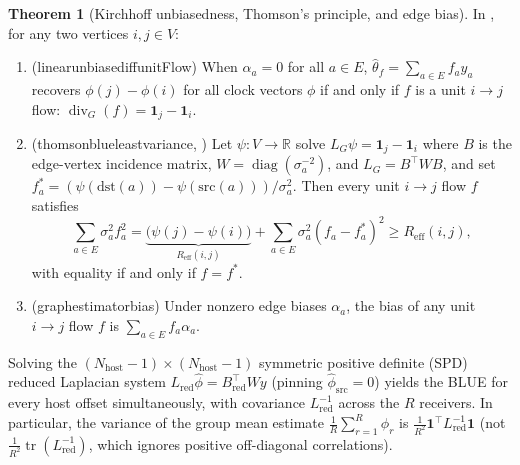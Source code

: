 \documentclass[11pt,a4paper]{article}
\DeclareRobustCommand{\lean}[1]{{\ttfamily\def\_{\textunderscore\allowbreak}#1}}
\newcommand{\R}{\mathbb{R}}
\theoremstyle{definition}
\newtheorem{theorem}[definition]{Theorem}
\begin{document}
\begin{theorem}[Kirchhoff unbiasedness, Thomson's principle, and edge bias]
\label{thm:thomson}
In , for any two vertices $i, j \in V$:
\begin{enumerate}
\item (\lean{linear\_unbiased\_iff\_unitFlow}) When $\alpha_a = 0$ for all
  $a \in E$, $\hat\theta_f = \sum_{a \in E} f_a y_a$ recovers
  $\phi(j) - \phi(i)$ for all clock vectors $\phi$ if and only if $f$ is a unit
  $i \to j$ flow: $\operatorname{div}_G(f) = \mathbf{1}_j - \mathbf{1}_i$.
\item (\lean{thomson\_blue\_least\_variance}, \cite{doyle1984,barooah2007,giridhar2006})
  Let $\psi : V \to \R$ solve $L_G \psi = \mathbf{1}_j - \mathbf{1}_i$ where
  $B$ is the edge-vertex incidence matrix,
  $W = \operatorname{diag}(\sigma_a^{-2})$, and $L_G = B^\top W B$, and set
  $f_a^* = (\psi(\mathrm{dst}(a)) - \psi(\mathrm{src}(a))) / \sigma_a^2$. Then
  every unit $i \to j$ flow $f$ satisfies
  \[
    \sum_{a \in E} \sigma_a^2 f_a^2
    = \underbrace{\bigl(\psi(j) - \psi(i)\bigr)}_{R_{\mathrm{eff}}(i, j)}
      + \sum_{a \in E} \sigma_a^2 (f_a - f_a^*)^2
    \ge R_{\mathrm{eff}}(i, j),
  \]
  with equality if and only if $f = f^*$.
\item (\lean{graph\_estimator\_bias}) Under nonzero edge biases $\alpha_a$, the
  bias of any unit $i \to j$ flow $f$ is $\sum_{a \in E} f_a \alpha_a$.
\end{enumerate}
\end{theorem}

Solving the $(N_{\mathrm{host}}{-}1)\times(N_{\mathrm{host}}{-}1)$ symmetric
positive definite (SPD) reduced Laplacian system
$L_{\mathrm{red}} \hat\phi = B_{\mathrm{red}}^\top W y$
(pinning $\hat\phi_{\mathrm{src}} = 0$) yields the BLUE for every host offset
simultaneously, with covariance $L_{\mathrm{red}}^{-1}$ across the $R$
receivers. In particular, the variance of the group mean estimate
$\frac{1}{R}\sum_{r=1}^R \hat\phi_r$ is
$\frac{1}{R^2}\mathbf{1}^\top L_{\mathrm{red}}^{-1}\mathbf{1}$ (not
$\frac{1}{R^2}\operatorname{tr}(L_{\mathrm{red}}^{-1})$, which ignores positive
off-diagonal correlations).
\end{document}
